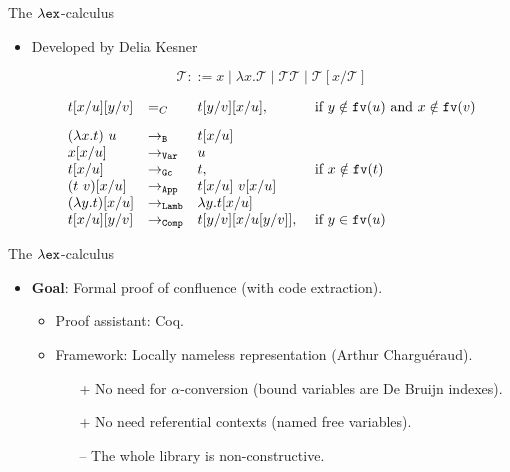 \documentclass[10pt]{beamer}
\newcommand{\term}{{\mathcal{T}}}
\newcommand{\fv}[1]{{\tt fv}(#1)}
\begin{document}
\begin{frame}[fragile]{The $\lambda{\tt ex}$-calculus}
\begin{itemize}
\item Developed by Delia Kesner \cite{kes09}

  $$\term ::= x \mid \lambda x.\term \mid \term\term \mid \term[x/\term]$$

  $$\begin{array}{llll}
      t[x/u][y/v] & =_C & t[y/v][x/u], & \mbox{ if } y \notin\fv{u} \mbox{ and } x \notin \fv{v} \\[.3cm]
      (\lambda x. t)\ u & \to_{\tt B} & t[x/u] & \\      
      x[x/u] & \to_{\tt Var} & u & \\      
      t[x/u] & \to_{\tt Gc} & t, & \mbox{ if } x \notin\fv{t} \\      
      (t\ v)[x/u] & \to_{\tt App} & t[x/u]\ v[x/u] & \\
      (\lambda y. t)[x/u] & \to_{\tt Lamb} & \lambda y.t[x/u] & \\
      t[x/u][y/v] & \to_{\tt Comp} & t[y/v][x/u[y/v]], & \mbox{ if } y \in\fv{u} \\            
      \end{array}$$
\end{itemize}
\end{frame}

\begin{frame}[fragile]{The $\lambda{\tt ex}$-calculus}
  \begin{itemize}
  \item {\bf Goal}: Formal proof of confluence (with code extraction).
    \begin{itemize}
    \item Proof assistant: Coq.
    \item Framework: Locally nameless representation (Arthur Charguéraud).
      \begin{itemize}
      \item[{\color{blue}+}] No need for $\alpha$-conversion (bound variables are De Bruijn indexes).
      \item[{\color{blue}+}] No need referential contexts (named free variables).
      \item[{\color{red}--}] The whole library is non-constructive.
      \end{itemize}
    \end{itemize}
  \end{itemize}
\end{frame}
\end{document}
